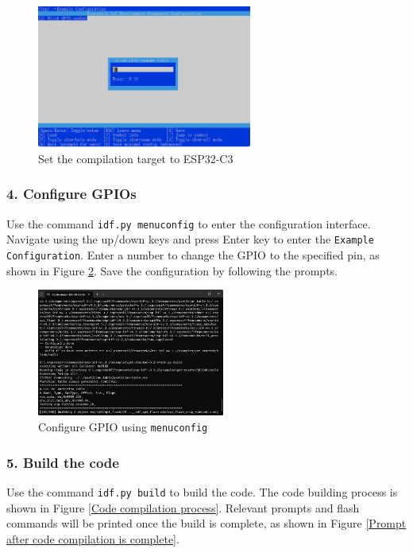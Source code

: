 \documentclass[a4paper,12pt,openany]{book}
\begin{document}
\begin{figure}[h!]
    \Centering
    \includegraphics[width=0.63\textwidth]{D4Z/4-18}
    \caption{Set the compilation target to ESP32-C3}
    \label{Set the compilation target to ESP32-C3}
\end{figure}

\subsubsection{4. Configure GPIOs}
Use the command \verb|idf.py menuconfig| to enter the configuration interface. Navigate using the up/down keys and press Enter key to enter the \verb|Example Configuration|. Enter a number to change the GPIO to the specified pin, as shown in Figure 
\ref{Configure GPIO using menuconfig}. Save the configuration by following the prompts.

\begin{figure}[h!]
    \Centering
    \includegraphics[width=0.55\textwidth]{D4Z/4-19}
    \caption{Configure GPIO using \texttt{menuconfig}}
    \label{Configure GPIO using menuconfig}
\end{figure}

\subsubsection{5. Build the code}
Use the command \verb|idf.py build| to build the code. The code building process is shown in Figure \ref{Code compilation process}. Relevant prompts and flash commands will be printed once the build is complete, as shown in Figure \ref{Prompt after code compilation is complete}.
\end{document}

